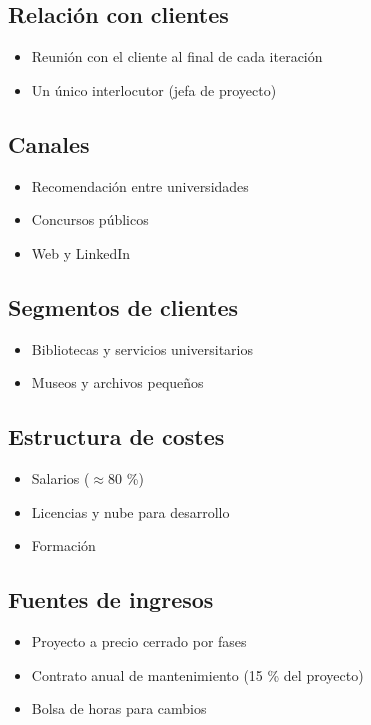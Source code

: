\documentclass[11pt,a4paper]{article}
\begin{document}
\subsection*{Relación con clientes}

\begin{itemize}
\item Reunión con el cliente al final de cada iteración
\item Un único interlocutor (jefa de proyecto)
\end{itemize}

\subsection*{Canales}

\begin{itemize}
\item Recomendación entre universidades
\item Concursos públicos
\item Web y LinkedIn
\end{itemize}

\subsection*{Segmentos de clientes}

\begin{itemize}
\item Bibliotecas y servicios universitarios
\item Museos y archivos pequeños
\end{itemize}

\subsection*{Estructura de costes}

\begin{itemize}
\item Salarios ($\approx$80 \%)
\item Licencias y nube para desarrollo
\item Formación
\end{itemize}

\subsection*{Fuentes de ingresos}

\begin{itemize}
\item Proyecto a precio cerrado por fases
\item Contrato anual de mantenimiento (15 \% del proyecto)
\item Bolsa de horas para cambios
\end{itemize}
\end{document}
